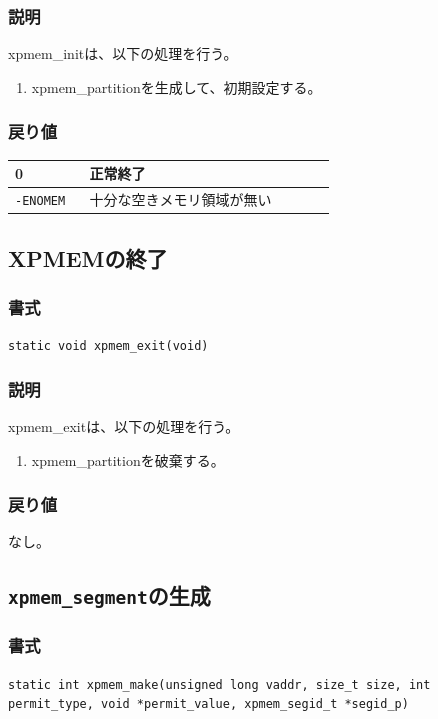 \documentclass[twoside,11pt,fleqn]{book}
\begin{document}
\subsubsection*{説明}{\quad}
xpmem\_initは、以下の処理を行う。
\begin{enumerate}
  \item xpmem\_partitionを生成して、初期設定する。
\end{enumerate}

\subsubsection*{戻り値}{\quad}
\begin{table}[!h]
\footnotesize
\begin{tabular}{|p{0.20\linewidth}|p{0.66\linewidth}|} \hline
0&正常終了\\ \hline
\texttt{-ENOMEM}&十分な空きメモリ領域が無い\\ \hline
\end{tabular}
\vspace{-0em}
\end{table}
\FloatBarrier

\subsection{XPMEMの終了}
\subsubsection*{書式}{\quad}
\texttt{static void xpmem\_exit(void)}

\subsubsection*{説明}{\quad}
xpmem\_exitは、以下の処理を行う。
\begin{enumerate}
  \item xpmem\_partitionを破棄する。
\end{enumerate}

\subsubsection*{戻り値}{\quad}
なし。

\subsection{\texttt{xpmem\_segment}の生成}
\subsubsection*{書式}{\quad}
\texttt{static int xpmem\_make(unsigned long vaddr,
        size\_t size,
        int permit\_type,
        void *permit\_value,
        xpmem\_segid\_t *segid\_p)
}
\end{document}
